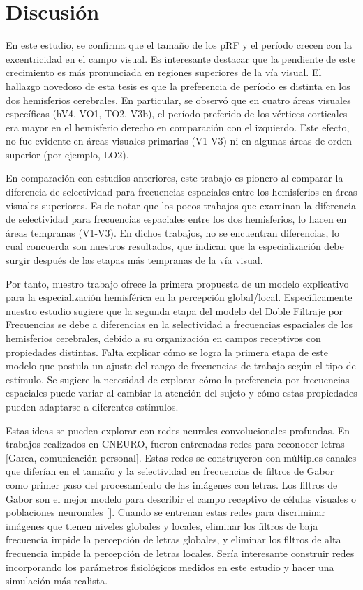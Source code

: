 \chapter{Discusi\'on}\label{chapter:discussion}

En este estudio, se confirma que el tamaño de los pRF y el período crecen con la excentricidad en el campo visual. Es interesante destacar que la pendiente de este crecimiento es más pronunciada en regiones superiores de la vía visual. El hallazgo novedoso de esta tesis es que la preferencia de per\'iodo es distinta en los dos hemisferios cerebrales. En particular, se observó que en cuatro áreas visuales específicas (hV4, VO1, TO2, V3b), el período preferido de los vértices corticales era mayor en el hemisferio derecho en comparación con el izquierdo. Este efecto, no fue evidente en áreas visuales primarias (V1-V3) ni en algunas áreas de orden superior (por ejemplo, LO2).

En comparación con estudios anteriores, este trabajo es pionero al comparar la diferencia de selectividad para frecuencias espaciales entre los hemisferios en áreas visuales superiores. Es de notar que los pocos trabajos  que examinan la diferencia de selectividad para frecuencias espaciales entre los dos hemisferios, lo hacen en áreas tempranas (V1-V3). En dichos trabajos, no se encuentran diferencias, lo cual concuerda son nuestros resultados, que indican que la especialización debe surgir después de las etapas más tempranas de la vía visual. 

Por tanto, nuestro trabajo ofrece la primera propuesta de un modelo explicativo para la especialización hemisférica en la percepción global/local. Específicamente nuestro estudio sugiere que la segunda etapa del modelo del Doble Filtraje por Frecuencias se debe a diferencias en la selectividad a frecuencias espaciales de los hemisferios cerebrales, debido a su organización en campos receptivos con propiedades distintas.  Falta explicar cómo se logra la primera etapa de este modelo que postula un ajuste del rango de frecuencias de trabajo según el tipo de estímulo. Se sugiere la necesidad de explorar cómo la preferencia por frecuencias espaciales puede variar al cambiar la atención del sujeto y cómo estas propiedades pueden adaptarse a diferentes estímulos.

Estas ideas se pueden explorar con redes neurales convolucionales profundas. En trabajos realizados en CNEURO, fueron entrenadas redes para reconocer letras [Garea, comunicación personal]. Estas redes se construyeron con múltiples canales que diferían en el tamaño y la selectividad en frecuencias de filtros de Gabor como primer paso del procesamiento de las imágenes con letras. Los filtros de Gabor son el mejor modelo para describir el campo receptivo de células visuales o poblaciones neuronales [\cite{kriegeskorte_understanding_2011}]. Cuando se entrenan estas redes para discriminar im\'agenes que tienen niveles globales y locales, eliminar los filtros de baja frecuencia impide la percepción de letras globales, y eliminar los filtros de alta frecuencia impide la percepción de letras locales. Sería interesante construir redes incorporando los parámetros fisiológicos medidos en este estudio y hacer una simulación más realista.

